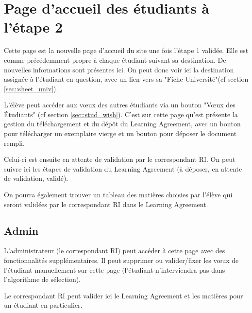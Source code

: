 \section{Page d'accueil des étudiants à l'étape 2}

Cette page est la nouvelle page d'accueil du site une fois l'étape 1 validée.
Elle est comme précédemment propre à chaque étudiant suivant sa destination. De nouvelles informations sont présentes ici.
On peut donc voir ici la destination assignée à l'étudiant en question, avec un lien vers sa "Fiche Université"(cf section \ref{sec::sheet_univ}).

L'élève peut accéder aux vœux des autres étudiants via un bouton "Vœux des Étudiants" (cf section \ref{sec::stud_wish}).
C'est sur cette page qu'est présente la gestion du téléchargement et du dépôt du Learning Agreement, avec un bouton pour télécharger un exemplaire vierge et un bouton pour déposer le document rempli.

Celui-ci est ensuite en attente de validation par le correspondant RI. On peut suivre ici les étapes de validation du Learning Agreement (à déposer, en attente de validation, validé).

\bigbreak

On pourra également trouver un tableau des matières choisies par l'élève qui seront validées par le correspondant RI dans le Learning Agreement.

\subsection{Admin}

L'administrateur (le correspondant RI) peut accéder à cette page avec des fonctionnalités supplémentaires.
Il peut supprimer ou valider/fixer les vœux de l'étudiant manuellement sur cette page (l'étudiant n'interviendra pas dans l'algorithme de sélection).

Le correspondant RI peut valider ici le Learning Agreement et les matières pour un étudiant en particulier.